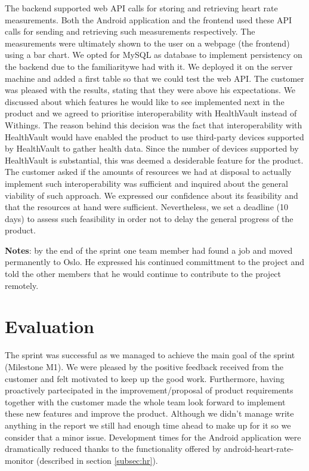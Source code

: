 The backend supported web API calls for storing and retrieving heart rate measurements.
Both the Android application and the frontend used these API calls for sending and retrieving
such measurements respectively.
The measurements were ultimately shown to the user on a webpage (the frontend) using a bar chart.
We opted for MySQL as database to implement persistency on the backend due to the familiaritywe had with it.
We deployed it on the server machine and added a first table so that we could test the web API.
The customer was pleased with the results, stating that they were above his expectations.
We discussed about which features he would like to see implemented next in the product
and we agreed to prioritise interoperability with HealthVault instead of Withings.
The reason behind this decision was the fact that interoperability with HealthVault would have
enabled the product to use third-party devices supported by HealthVault to gather health data.
Since the number of devices supported by HealthVault is substantial, this was deemed a
desiderable feature for the product.
The customer asked if the amounts of resources we had at disposal to actually implement
such interoperability was sufficient and inquired about the general viability of such approach.
We expressed our confidence about its feasibility and that the resources at hand were sufficient.
Nevertheless, we set a deadline (10 days) to assess such feasibility in order not to delay
the general progress of the product.

\textbf{Notes}: by the end of the sprint one team member had found a job and moved permanently to Oslo.
He expressed his continued committment to the project and told the other members that he would continue
to contribute to the project remotely.

\section{Evaluation}

The sprint was successful as we managed to achieve the main goal of the sprint (Milestone M1).
We were pleased by the positive feedback received from the customer and felt motivated to
keep up the good work. Furthermore, having proactively partecipated in the improvement/proposal
of product requirements together with the customer made the whole team look forward to implement these new
features and improve the product. Although we didn't manage write anything in the report we still had enough
time ahead to make up for it so we consider that a minor issue.
Development times for the Android application were dramatically reduced thanks to the functionality
offered by android-heart-rate-monitor (described in section \ref{subsec:hr}).

